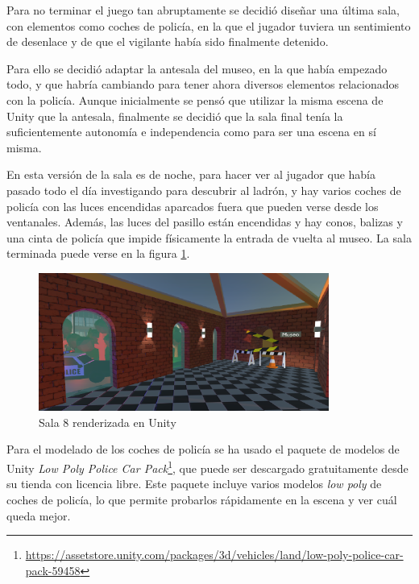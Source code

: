 Para no terminar el juego tan abruptamente se decidió diseñar una última sala, con elementos como coches de policía, en la que el jugador tuviera un sentimiento de desenlace y de que el vigilante había sido finalmente detenido.

Para ello se decidió adaptar la antesala del museo, en la que había empezado todo, y que habría cambiando para tener ahora diversos elementos relacionados con la policía. Aunque inicialmente se pensó que utilizar la misma escena de Unity que la antesala, finalmente se decidió que la sala final tenía la suficientemente autonomía e independencia como para ser una escena en sí misma.

En esta versión de la sala es de noche, para hacer ver al jugador que había pasado todo el día investigando para descubrir al ladrón, y hay varios coches de policía con las luces encendidas aparcados fuera que pueden verse desde los ventanales. Además, las luces del pasillo están encendidas y hay conos, balizas y una cinta de policía que impide físicamente la entrada de vuelta al museo. La sala terminada puede verse en la figura \ref{fig:unity-sala-8}.

\begin{figure}[!h]
\begin{center}
\includegraphics[width=0.85\textwidth]{imagenes/7/salas-unity/unity-sala-8.png}
\caption{Sala 8 renderizada en Unity}
\label{fig:unity-sala-8}
\end{center}
\end{figure}

Para el modelado de los coches de policía se ha usado el paquete de modelos de Unity \textit{Low Poly Police Car Pack}\footnote{\url{https://assetstore.unity.com/packages/3d/vehicles/land/low-poly-police-car-pack-59458}}, que puede ser descargado gratuitamente desde su tienda con licencia libre. Este paquete incluye varios modelos \textit{low poly} de coches de policía, lo que permite probarlos rápidamente en la escena y ver cuál queda mejor.

